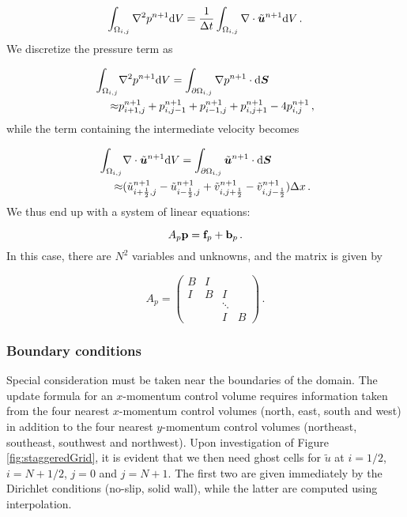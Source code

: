 \documentclass[final,3p,twocolumn]{elsarticle}
\begin{document}
\begin{equation}
    \int_{\Omega_{i,j}} \nabla^2 p^{n+1} {\rm d}V = \frac{1}{\Delta t}
    \int_{\Omega_{i,j}} \nabla \cdot \tilde{\bm{u}}^{n+1} {\rm d}V \,.
\end{equation}
%
We discretize the pressure term as 

\begin{align}
    \nonumber
    \int_{\Omega_{i,j}} & \nabla^2 p^{n+1} {\rm d}V = 
    \int_{\partial \Omega_{i,j}} \nabla p^{n+1} \cdot {\rm d}\bm{S} \\
    \approx& p_{i+1,j}^{n+1} + p_{i,j-1}^{n+1} + p_{i-1,j}^{n+1} +
    p_{i,j+1}^{n+1} -4 p_{i,j}^{n+1} \,,
\end{align}
%
while the term containing the intermediate velocity becomes 

\begin{align}
    \nonumber
    \int_{\Omega_{i,j}} & \nabla \cdot \tilde{\bm{u}}^{n+1} {\rm d}V = 
    \int_{\partial \Omega_{i,j}} \tilde{\bm{u}}^{n+1} \cdot {\rm d}\bm{S} \\
    \approx& (\tilde{u}_{i+\frac{1}{2},j}^{n+1} -
    \tilde{u}_{i-\frac{1}{2},j}^{n+1} + \tilde{v}_{i,j+\frac{1}{2}}^{n+1} -
    \tilde{v}_{i,j-\frac{1}{2}}^{n+1}) \Delta x \,.
\end{align}
%
We thus end up with a system of linear equations: 

\begin{equation}
    A_p {\bf p} = {\bf f}_p + {\bf b}_p \,.
    \label{eq:pressureMatrix}
\end{equation}
%
In this case, there are $N^2$ variables and unknowns, and the matrix is given
by 

\begin{equation*}
    A_p = 
    \begin{pmatrix}
        B & I \\
        I & B & I \\
        & & \ddots \\ 
        & & I & B
    \end{pmatrix} \,.
\end{equation*}

\subsubsection{Boundary conditions}

Special consideration must be taken near the boundaries of the domain. The
update formula for an $x$-momentum control volume requires information taken
from the four nearest $x$-momentum control volumes (north, east, south and
west) in addition to the four nearest $y$-momentum control volumes (northeast,
southeast, southwest and northwest). Upon investigation of Figure
\ref{fig:staggeredGrid}, it is evident that we then need ghost cells for
$\tilde{u}$ at $i=1/2$, $i=N+1/2$, $j=0$ and $j=N+1$. The first two are given
immediately by the Dirichlet conditions (no-slip, solid wall), while the latter
are computed using interpolation. 
\end{document}
